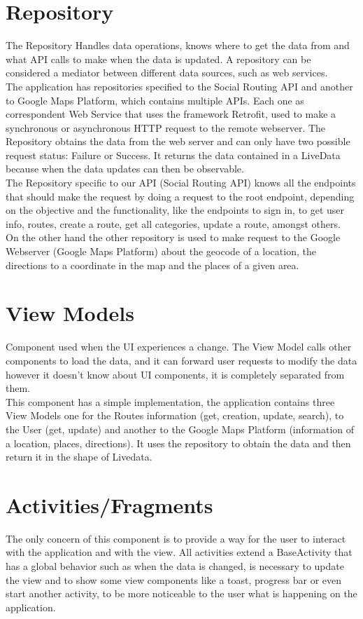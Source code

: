 \section*{Repository}
The Repository Handles data operations, knows where to get the data from
and what API calls to make when the data is updated. A repository can be
considered a mediator between different data sources, such as web services. \\
The application has repositories specified to the Social Routing API and another to Google Maps Platform, which contains
multiple APIs. Each one as correspondent Web Service that uses the
framework Retrofit\cite{retrofit}, used to make a synchronous or asynchronous HTTP request to the remote webserver. The Repository obtains the data
from the web server and can only have two possible request status: Failure or Success. It returns the data contained in a LiveData\cite{livedata} because when the data 
updates can then be observable. \\
The Repository specific to our API (Social Routing API) knows all the endpoints\cite{endpoint TODO} that should make the request by doing a request to the root endpoint, 
depending on the objective and the functionality, like the endpoints to sign in, to get user info, routes, create a route, get all categories, update a route, amongst others. \\
On the other hand the other repository is used to make request to the Google Webserver (Google Maps Platform) about the geocode\cite{geocode} of a location, the directions to a 
coordinate in the map and the places of a given area. 

\section*{View Models}
Component used when the UI experiences a change. The View Model calls
other components to load the data, and it can forward user requests to
modify the data however it doesn't know about UI components, 
it is completely separated from them. \\
This component has a simple implementation, the application contains three View Models one for the Routes information (get, creation, update, search), 
to the User (get, update) and another to the Google Maps Platform (information of a location, places, directions). It uses the repository to obtain the data and 
then return it in the shape of Livedata.

\section*{Activities/Fragments}
The only concern of this component is to provide a way for the user to interact with the application and with the view.
All activities extend a BaseActivity that has a global behavior such as when the data is changed, is necessary to update the view and to show some view components 
like a toast\cite{toasts}, progress bar\cite{progressBar} or even start another activity, to be more noticeable to the user what is happening on the application.\\

